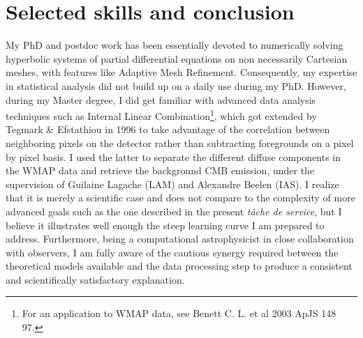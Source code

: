 \documentclass[a4paper,12pt,onecolumn]{article}
\begin{document}
\section*{Selected skills and conclusion}

My PhD and postdoc work has been essentially devoted to numerically solving hyperbolic systems of partial differential equations on non necessarily Cartesian meshes, with features like Adaptive Mesh Refinement. Consequently, my expertise in statistical analysis did not build up on a daily use during my PhD. However, during my Master degree, I did get familiar with advanced data analysis techniques such as Internal Linear Combination\footnote{For an application to WMAP data, see Benett C. L. et al 2003 ApJS 148 97.}, which got extended by Tegmark \& Efstathiou in 1996 to take advantage of the correlation between neighboring pixels on the detector rather than subtracting foregrounds on a pixel by pixel basis. I used the latter to separate the different diffuse components in the WMAP data and retrieve the background CMB emission, under the supervision of Guilaine Lagache (LAM) and Alexandre Beelen (IAS). I realize that it is merely a scientific case and does not compare to the complexity of more advanced goals such as the one described in the present \textit{t\^{a}che de service}, but I believe it illustrates well enough the steep learning curve I am prepared to address. Furthermore, being a computational astrophysicist in close collaboration with observers, I am fully aware of the cautious synergy required between the theoretical models available and the data processing step to produce a consistent and scientifically satisfactory explanation.
\end{document}

